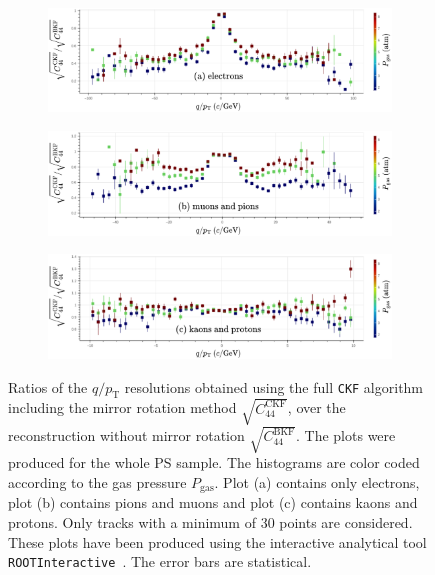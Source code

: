 \begin{figure}[!ht]
     \centering
     \begin{subfigure}[h!]{0.9\textwidth}
         \centering
         \includegraphics[width=\textwidth]{figures/ch5-KF_NDGAr/ToySample/ParScan/TotVSLegVSdens_11_label.eps}
         \caption{}
         \label{fig:SingleVSLeg_e}
     \end{subfigure}
     \begin{subfigure}[b]{0.9\textwidth}
         \centering
         \includegraphics[width=\textwidth]{figures/ch5-KF_NDGAr/ToySample/ParScan/TotVSLegVSdens_13_211_label.eps}
         \caption{}
         \label{fig:SingleVSLeg_mu_pi}
     \end{subfigure}
          \begin{subfigure}[b]{0.9\textwidth}
         \centering
         \includegraphics[width=\textwidth]{figures/ch5-KF_NDGAr/ToySample/ParScan/TotVSLegVSdens_2212_321_label.eps}
         \caption{}
         \label{fig:SingleVSLeg_proton_kaon}
     \end{subfigure}
        \caption{Ratios of the $q/p_\text{T}$ resolutions obtained using the full \texttt{CKF} algorithm including the mirror rotation method $\sqrt{C_{44}^{\textrm{CKF}}}$, over the reconstruction without mirror rotation $\sqrt{C_{44}^{\text{BKF}}}$. The plots were produced for the whole PS sample. The histograms are color coded according to the gas pressure $P_{\textrm{gas}}$. Plot (a) contains only electrons, plot (b) contains pions and muons and plot (c) contains kaons and protons. Only tracks with a minimum of 30 points are considered. These plots have been produced using the interactive analytical tool \texttt{ROOTInteractive}~\cite{RootInt}. The error bars are statistical.}
        \label{fig:SingleVSLeg_dens}
\end{figure}

